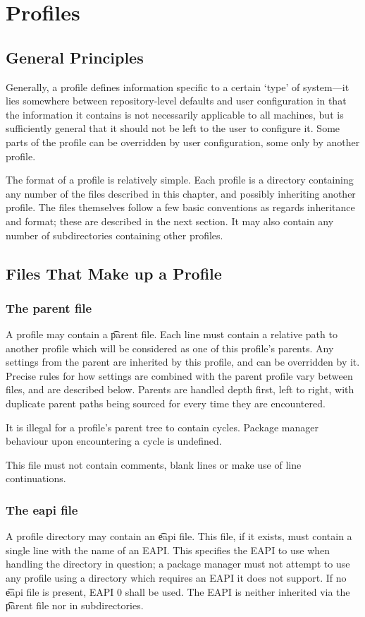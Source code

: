 \chapter{Profiles}
\label{sec:profiles}

\section{General Principles}
Generally, a profile defines information specific to a certain `type' of system---it lies somewhere
between repository-level defaults and user configuration in that the information it contains is not
necessarily applicable to all machines, but is sufficiently general that it should not be left to
the user to configure it. Some parts of the profile can be overridden by user configuration, some
only by another profile.

The format of a profile is relatively simple. Each profile is a directory containing any number of
the files described in this chapter, and possibly inheriting another profile. The files themselves
follow a few basic conventions as regards inheritance and format; these are described in the next
section. It may also contain any number of subdirectories containing other profiles.

\section{Files That Make up a Profile}

\subsection{The parent file}
A profile may contain a \t{parent} file. Each line must contain a relative path to another profile
which will be considered as one of this profile's parents. Any settings from the parent are
inherited by this profile, and can be overridden by it. Precise rules for how settings are combined
with the parent profile vary between files, and are described below. Parents are handled depth
first, left to right, with duplicate parent paths being sourced for every time they are encountered.

It is illegal for a profile's parent tree to contain cycles. Package manager behaviour upon
encountering a cycle is undefined.

This file must not contain comments, blank lines or make use of line continuations.

\subsection{The eapi file}
\label{sec:profile-eapi}
A profile directory may contain an \t{eapi} file. This file, if it exists, must contain a single
line with the name of an EAPI\@. This specifies the EAPI to use when handling the directory in
question; a package manager must not attempt to use any profile using a directory which requires an
EAPI it does not support. If no \t{eapi} file is present, EAPI 0 shall be used. The EAPI is neither
inherited via the \t{parent} file nor in subdirectories.

